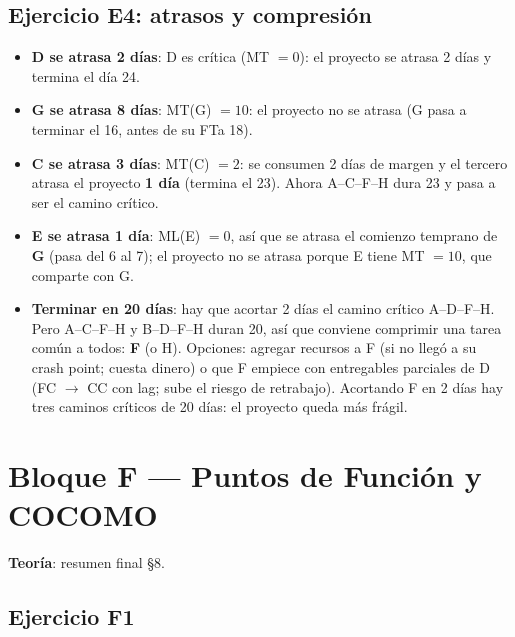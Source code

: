\documentclass[11pt,a4paper]{article}
\begin{document}
\subsection*{Ejercicio E4: atrasos y compresión}
\begin{itemize}
  \item \textbf{D se atrasa 2 días}: D es crítica (MT $= 0$): el proyecto se atrasa 2 días y termina el día 24.
  \item \textbf{G se atrasa 8 días}: MT(G) $= 10$: el proyecto no se atrasa (G pasa a terminar el 16, antes de su FTa 18).
  \item \textbf{C se atrasa 3 días}: MT(C) $= 2$: se consumen 2 días de margen y el tercero atrasa el proyecto
  \textbf{1 día} (termina el 23). Ahora A--C--F--H dura 23 y pasa a ser el camino crítico.
  \item \textbf{E se atrasa 1 día}: ML(E) $= 0$, así que se atrasa el comienzo temprano de \textbf{G} (pasa del 6 al
  7); el proyecto no se atrasa porque E tiene MT $= 10$, que comparte con G.
  \item \textbf{Terminar en 20 días}: hay que acortar 2 días el camino crítico A--D--F--H. Pero A--C--F--H y
  B--D--F--H duran 20, así que conviene comprimir una tarea común a todos: \textbf{F} (o H). Opciones:
  agregar recursos a F (si no llegó a su crash point; cuesta dinero) o que F empiece con entregables parciales
  de D (FC $\to$ CC con lag; sube el riesgo de retrabajo). Acortando F en 2 días
  hay tres caminos críticos de 20 días: el proyecto queda más frágil.
\end{itemize}

\section{Bloque F --- Puntos de Función y COCOMO}
\textbf{Teoría}: resumen final §8.
\subsection*{Ejercicio F1}
\end{document}
